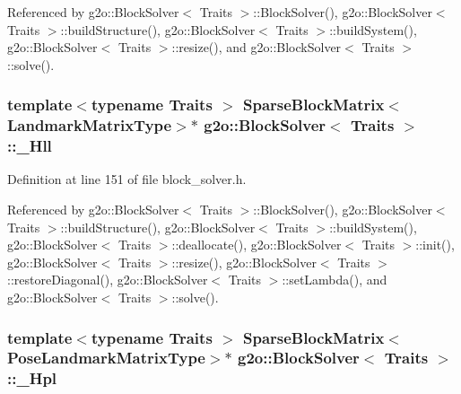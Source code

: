 Referenced by g2o\+::\+Block\+Solver$<$ Traits $>$\+::\+Block\+Solver(), g2o\+::\+Block\+Solver$<$ Traits $>$\+::build\+Structure(), g2o\+::\+Block\+Solver$<$ Traits $>$\+::build\+System(), g2o\+::\+Block\+Solver$<$ Traits $>$\+::resize(), and g2o\+::\+Block\+Solver$<$ Traits $>$\+::solve().

\subsubsection[{\texorpdfstring{\+\_\+\+Hll}{_Hll}}]{\setlength{\rightskip}{0pt plus 5cm}template$<$typename Traits $>$ {\bf Sparse\+Block\+Matrix}$<${\bf Landmark\+Matrix\+Type}$>$$\ast$ {\bf g2o\+::\+Block\+Solver}$<$ Traits $>$\+::\+\_\+\+Hll\hspace{0.3cm}{\ttfamily [protected]}}\hypertarget{classg2o_1_1BlockSolver_a88d4c24df24a8fb72be1a4e4cff03d71}{}\label{classg2o_1_1BlockSolver_a88d4c24df24a8fb72be1a4e4cff03d71}


Definition at line 151 of file block\+\_\+solver.\+h.



Referenced by g2o\+::\+Block\+Solver$<$ Traits $>$\+::\+Block\+Solver(), g2o\+::\+Block\+Solver$<$ Traits $>$\+::build\+Structure(), g2o\+::\+Block\+Solver$<$ Traits $>$\+::build\+System(), g2o\+::\+Block\+Solver$<$ Traits $>$\+::deallocate(), g2o\+::\+Block\+Solver$<$ Traits $>$\+::init(), g2o\+::\+Block\+Solver$<$ Traits $>$\+::resize(), g2o\+::\+Block\+Solver$<$ Traits $>$\+::restore\+Diagonal(), g2o\+::\+Block\+Solver$<$ Traits $>$\+::set\+Lambda(), and g2o\+::\+Block\+Solver$<$ Traits $>$\+::solve().

\subsubsection[{\texorpdfstring{\+\_\+\+Hpl}{_Hpl}}]{\setlength{\rightskip}{0pt plus 5cm}template$<$typename Traits $>$ {\bf Sparse\+Block\+Matrix}$<${\bf Pose\+Landmark\+Matrix\+Type}$>$$\ast$ {\bf g2o\+::\+Block\+Solver}$<$ Traits $>$\+::\+\_\+\+Hpl\hspace{0.3cm}{\ttfamily [protected]}}\hypertarget{classg2o_1_1BlockSolver_a0f6051339990e95aa587145a8a6f4f5f}{}\label{classg2o_1_1BlockSolver_a0f6051339990e95aa587145a8a6f4f5f}


